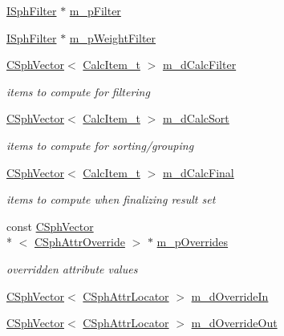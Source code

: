 \begin{DoxyCompactItemize}
\hyperlink{structISphFilter}{I\-Sph\-Filter} $\ast$ \hyperlink{classCSphQueryContext_a64ea660caf0c74b4416b30ea4faaa656}{m\-\_\-p\-Filter}
\item 
\hyperlink{structISphFilter}{I\-Sph\-Filter} $\ast$ \hyperlink{classCSphQueryContext_a520fee85c149346a61e134802dd98987}{m\-\_\-p\-Weight\-Filter}
\item 
\hyperlink{classCSphVector}{C\-Sph\-Vector}$<$ \hyperlink{structCSphQueryContext_1_1CalcItem__t}{Calc\-Item\-\_\-t} $>$ \hyperlink{classCSphQueryContext_a91e8831b84db253a2ca879097441859e}{m\-\_\-d\-Calc\-Filter}
\begin{DoxyCompactList}\small\item\em items to compute for filtering \end{DoxyCompactList}\item 
\hyperlink{classCSphVector}{C\-Sph\-Vector}$<$ \hyperlink{structCSphQueryContext_1_1CalcItem__t}{Calc\-Item\-\_\-t} $>$ \hyperlink{classCSphQueryContext_a3e7861fc7ec930997c5b3f0c2fc57a8d}{m\-\_\-d\-Calc\-Sort}
\begin{DoxyCompactList}\small\item\em items to compute for sorting/grouping \end{DoxyCompactList}\item 
\hyperlink{classCSphVector}{C\-Sph\-Vector}$<$ \hyperlink{structCSphQueryContext_1_1CalcItem__t}{Calc\-Item\-\_\-t} $>$ \hyperlink{classCSphQueryContext_abe6a6a77e323d80d90ff494bb11acc3d}{m\-\_\-d\-Calc\-Final}
\begin{DoxyCompactList}\small\item\em items to compute when finalizing result set \end{DoxyCompactList}\item 
const \hyperlink{classCSphVector}{C\-Sph\-Vector}\\*
$<$ \hyperlink{classCSphAttrOverride}{C\-Sph\-Attr\-Override} $>$ $\ast$ \hyperlink{classCSphQueryContext_a5017f23729432ca54f9530a6555f46f3}{m\-\_\-p\-Overrides}
\begin{DoxyCompactList}\small\item\em overridden attribute values \end{DoxyCompactList}\item 
\hyperlink{classCSphVector}{C\-Sph\-Vector}$<$ \hyperlink{structCSphAttrLocator}{C\-Sph\-Attr\-Locator} $>$ \hyperlink{classCSphQueryContext_acb76110a17747348c8ad6351674da55e}{m\-\_\-d\-Override\-In}
\item 
\hyperlink{classCSphVector}{C\-Sph\-Vector}$<$ \hyperlink{structCSphAttrLocator}{C\-Sph\-Attr\-Locator} $>$ \hyperlink{classCSphQueryContext_a2b3bade694af993198331a05fc6f8ab6}{m\-\_\-d\-Override\-Out}

\end{DoxyCompactItemize}
